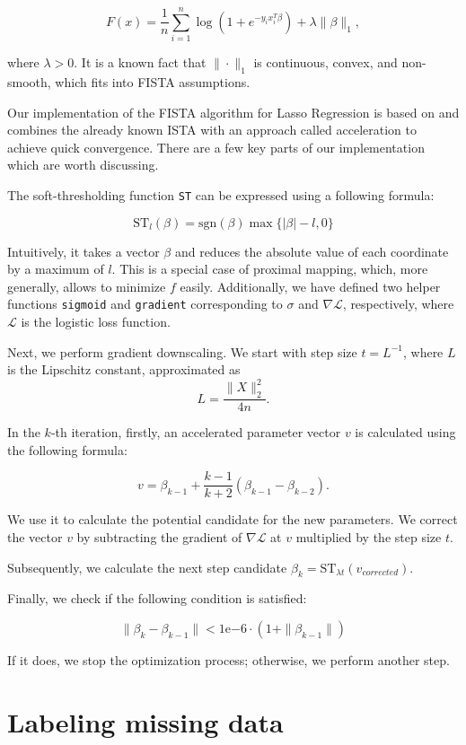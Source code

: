 \documentclass{article}
\begin{document}
$$F(x) = \frac{1}{n} \sum_{i=1}^n \log(1 + e^{-y_i x_i^T \beta}) + \lambda\|\beta\|_1,$$

where $\lambda > 0$. It is a known fact that $\|\cdot\|_1$ is continuous, convex, and non-smooth, which fits into FISTA assumptions.

Our implementation of the FISTA algorithm for Lasso Regression is based on \cite{fista_algo} and combines the already known ISTA with an approach called acceleration to achieve quick convergence. There are a few key parts of our implementation which are worth discussing.

The soft-thresholding function \verb|ST| can be expressed using a following formula:

$$\textrm{ST}_l(\beta) = \textrm{sgn}(\beta) \max\{|\beta| - l, 0\}$$

Intuitively, it takes a vector $\beta$ and reduces the absolute value of each coordinate by a maximum of $l$. This is a special case of proximal mapping, which, more generally, allows to minimize $f$ easily. Additionally, we have defined two helper functions \verb|sigmoid| and \verb|gradient| corresponding to $\sigma$ and $\nabla \mathcal{L}$, respectively, where $\mathcal{L}$ is the logistic loss function.

Next, we perform gradient downscaling. We start with step size $t = L^{-1}$, where $L$ is the Lipschitz constant, approximated as $$L = \frac{\|X\|^2_2}{4n}.$$ 

In the $k$-th iteration, firstly, an accelerated parameter vector $v$ is calculated using the following formula:

$$v = \beta_{k-1} + \frac{k-1}{k+2}(\beta_{k-1} - \beta_{k-2}).$$

We use it to calculate the potential candidate for the new parameters. We correct the vector $v$ by subtracting the gradient of $\nabla\mathcal{L}$ at $v$ multiplied by the step size $t$. 

Subsequently, we calculate the next step candidate $\beta_k = \textrm{ST}_{\lambda t}(v_{corrected})$.

Finally, we check if the following condition is satisfied:

$$\|\beta_k - \beta_{k-1} \| < 1\mathrm{e}{-6} \cdot (1 + \|\beta_{k-1} \|)$$

If it does, we stop the optimization process; otherwise, we perform another step.

\section{Labeling missing data}
\end{document}
